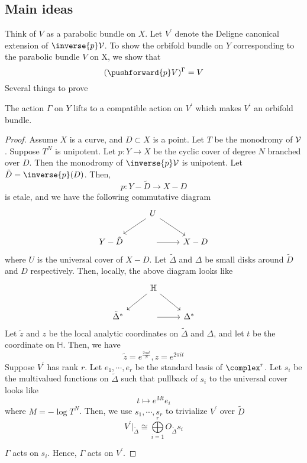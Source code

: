 \documentclass{article}
\begin{document}
\subsection{Main ideas}
Think of $V$ as a parabolic bundle on $X$. 
Let $V^\prime$ denote the Deligne canonical extension of $\inverse{p}\V$.
To show the orbifold bundle on $Y$ corresponding to the parabolic bundle $V$ on X, we show that
\[
    (\pushforward{p}V)^{\Gamma} = V
\]
Several things to prove 
\begin{lemma}
The action $\Gamma$ on $Y$ lifts to a compatible action on $V^\prime$ which makes $V^\prime$ an orbifold 
bundle.
\end{lemma}
\begin{proof}
Assume $X$ is a curve, and $D \subset X$ is a point. 
Let $T$ be the monodromy of $\mathcal{V}$. Suppose $T^N$ is unipotent.
Let $p: Y \rightarrow X$ be the cyclic cover of degree $N$ 
branched over $D$. Then the monodromy of $\inverse{p}\V$ is unipotent.
Let $\tilde{D} = \inverse{p}(D)$. Then,
\[
    p: Y - \tilde{D} \rightarrow X - D
\]
is etale, and we have the following commutative diagram
\[
\begin{tikzcd}
    & U \arrow{ld} \arrow{dr} &\\
Y - \tilde{D} & \arrow{r} & X - D
\end{tikzcd}
\]
where $U$ is the universal cover of $X - D$. 
Let $\tilde{\Delta}$ and $\Delta$ be small disks around $\tilde{D}$ and $D$ respectively.
Then, locally, the above diagram looks like
\[
\begin{tikzcd}
    & \mathbb{H} \arrow{ld} \arrow{dr} & \\
\tilde{\Delta}^* & \arrow{r} & \Delta^*
\end{tikzcd}
\]
Let $\tilde{z}$ and $z$ be the local analytic coordinates on $\tilde{\Delta}$ and $\Delta$,
and let $t$ be the coordinate on $\mathbb{H}$. Then, we have
\[
    \tilde{z} = e^{\frac{2\pi it}{N}}, z = e^{2\pi i t}
\]
Suppose $V^\prime$ has rank $r$. Let $e_1,\cdots, e_r$ be the standard basis of $\complex^r$.
Let $s_i$ be the multivalued functions on $\tilde{\Delta}$ such that pullback of $s_i$ to the 
universal cover looks like
\[
    t \mapsto e^{Mt}e_i
\]
where $M = -\log T^N$. Then, we use $s_1,\cdots,s_r$ to trivialize $V^\prime$ over $\tilde{D}$
\[
    V^\prime |_{\tilde{\Delta}} \cong \bigoplus\limits_{i=1}^{r} O_{\tilde{\Delta}}s_i
\]

$\Gamma$ acts on $s_i$. Hence, $\Gamma$ acts on $V^\prime$.


\end{proof}
  
\end{document}
